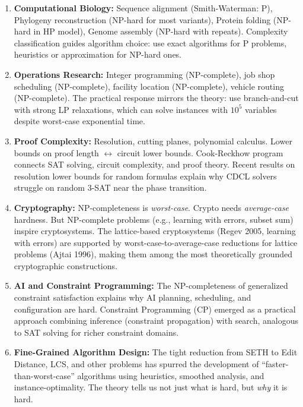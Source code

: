 \begin{enumerate}
\item \textbf{Computational Biology:} Sequence alignment (Smith-Waterman: P), Phylogeny reconstruction (NP-hard for most variants), Protein folding (NP-hard in HP model), Genome assembly (NP-hard with repeats). Complexity classification guides algorithm choice: use exact algorithms for P problems, heuristics or approximation for NP-hard ones.

\item \textbf{Operations Research:} Integer programming (NP-complete), job shop scheduling (NP-complete), facility location (NP-complete), vehicle routing (NP-complete). The practical response mirrors the theory: use branch-and-cut with strong LP relaxations, which can solve instances with $10^5$ variables despite worst-case exponential time.

\item \textbf{Proof Complexity:} Resolution, cutting planes, polynomial calculus. Lower bounds on proof length $\leftrightarrow$ circuit lower bounds. Cook-Reckhow program connects SAT solving, circuit complexity, and proof theory. Recent results on resolution lower bounds for random formulas explain why CDCL solvers struggle on random 3-SAT near the phase transition.

\item \textbf{Cryptography:} NP-completeness is \emph{worst-case}. Crypto needs \emph{average-case} hardness. But NP-complete problems (e.g., learning with errors, subset sum) inspire cryptosystems. The lattice-based cryptosystems (Regev 2005, learning with errors) are supported by worst-case-to-average-case reductions for lattice problems (Ajtai 1996), making them among the most theoretically grounded cryptographic constructions.

\item \textbf{AI and Constraint Programming:} The NP-completeness of generalized constraint satisfaction explains why AI planning, scheduling, and configuration are hard. Constraint Programming (CP) emerged as a practical approach combining inference (constraint propagation) with search, analogous to SAT solving for richer constraint domains.

\item \textbf{Fine-Grained Algorithm Design:} The tight reduction from SETH to Edit Distance, LCS, and other problems has spurred the development of ``faster-than-worst-case'' algorithms using heuristics, smoothed analysis, and instance-optimality. The theory tells us not just what is hard, but \emph{why} it is hard.


\end{enumerate}
